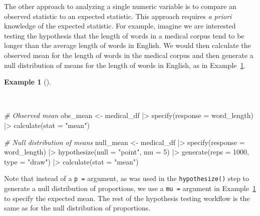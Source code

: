 \documentclass[
  letterpaper,
]{latex/krantz}
\newenvironment{Shaded}{\begin{snugshade}}{\end{snugshade}}
\newcommand{\AttributeTok}[1]{\textcolor[rgb]{0.00,0.00,0.00}{#1}}
\newcommand{\CommentTok}[1]{\textcolor[rgb]{0.00,0.00,0.00}{\textit{#1}}}
\newcommand{\DecValTok}[1]{\textcolor[rgb]{0.00,0.00,0.00}{#1}}
\newcommand{\FunctionTok}[1]{\textcolor[rgb]{0.00,0.00,0.00}{#1}}
\newcommand{\NormalTok}[1]{\textcolor[rgb]{0.00,0.00,0.00}{#1}}
\newcommand{\OtherTok}[1]{\textcolor[rgb]{0.00,0.00,0.00}{#1}}
\newcommand{\SpecialCharTok}[1]{\textcolor[rgb]{0.00,0.00,0.00}{#1}}
\newcommand{\StringTok}[1]{\textcolor[rgb]{0.00,0.00,0.00}{#1}}
\theoremstyle{definition}
\newtheorem{example}{Example}[chapter]
\theoremstyle{remark}
\begin{document}
The other approach to analyzing a single numeric variable is to compare
an observed statistic to an expected statistic. This approach requires
\emph{a priori} knowledge of the expected statistic. For example,
imagine we are interested testing the hypothesis that the length of
words in a medical corpus tend to be longer than the average length of
words in English. We would then calculate the observed mean for the
length of words in the medical corpus and then generate a null
distribution of means for the length of words in English, as in
Example~\ref{exm-ida-num-uni-null-mean}.

\begin{example}[]\protect\hypertarget{exm-ida-num-uni-null-mean}{}\label{exm-ida-num-uni-null-mean}

~

\begin{Shaded}
\begin{Highlighting}[]
\CommentTok{\# Observed mean}
\NormalTok{obs\_mean }\OtherTok{\textless{}{-}}
\NormalTok{  medical\_df }\SpecialCharTok{|\textgreater{}}
  \FunctionTok{specify}\NormalTok{(}\AttributeTok{response =}\NormalTok{ word\_length) }\SpecialCharTok{|\textgreater{}}
  \FunctionTok{calculate}\NormalTok{(}\AttributeTok{stat =} \StringTok{"mean"}\NormalTok{)}

\CommentTok{\# Null distribution of means}
\NormalTok{null\_mean }\OtherTok{\textless{}{-}}
\NormalTok{  medical\_df }\SpecialCharTok{|\textgreater{}}
  \FunctionTok{specify}\NormalTok{(}\AttributeTok{response =}\NormalTok{ word\_length) }\SpecialCharTok{|\textgreater{}}
  \FunctionTok{hypothesize}\NormalTok{(}\AttributeTok{null =} \StringTok{"point"}\NormalTok{, }\AttributeTok{mu =} \DecValTok{5}\NormalTok{) }\SpecialCharTok{|\textgreater{}}
  \FunctionTok{generate}\NormalTok{(}\AttributeTok{reps =} \DecValTok{1000}\NormalTok{, }\AttributeTok{type =} \StringTok{"draw"}\NormalTok{) }\SpecialCharTok{|\textgreater{}}
  \FunctionTok{calculate}\NormalTok{(}\AttributeTok{stat =} \StringTok{"mean"}\NormalTok{)}
\end{Highlighting}
\end{Shaded}

\end{example}

Note that instead of a \texttt{p\ =} argument, as was used in the
\texttt{hypothesize()} step to generate a null distribution of
proportions, we use a \texttt{mu\ =} argument in
Example~\ref{exm-ida-num-uni-null-mean} to specify the expected mean.
The rest of the hypothesis testing workflow is the same as for the null
distribution of proportions.
\end{document}
